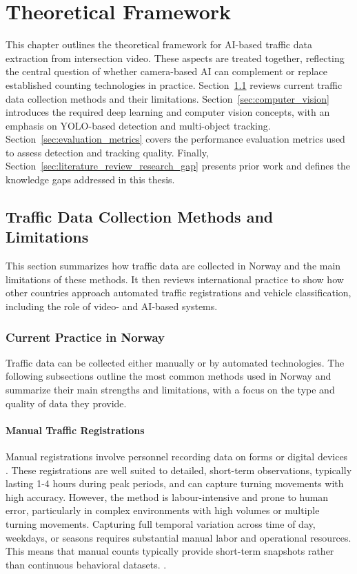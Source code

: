 \chapter{Theoretical Framework}
\label{chap:theory}
This chapter outlines the theoretical framework for AI-based traffic data extraction from intersection video. These aspects are treated together, reflecting the central question of whether camera-based AI can complement or replace established counting technologies in practice. Section~\ref{sec:traffic_data_collection_methods} reviews current traffic data collection methods and their limitations. Section~\ref{sec:computer_vision} introduces the required deep learning and computer vision concepts, with an emphasis on YOLO-based detection and multi-object tracking. Section~\ref{sec:evaluation_metrics} covers the performance evaluation metrics used to assess detection and tracking quality. Finally, Section~\ref{sec:literature_review_research_gap} presents prior work and defines the knowledge gaps addressed in this thesis.


\section{Traffic Data Collection Methods and Limitations}
\label{sec:traffic_data_collection_methods}
This section summarizes how traffic data are collected in Norway and the main limitations of these methods. It then reviews international practice to show how other countries approach automated traffic registrations and vehicle classification, including the role of video- and AI-based systems.

\subsection{Current Practice in Norway}
Traffic data can be collected either manually or by automated technologies. The following subsections outline the most common methods used in Norway and summarize their main strengths and limitations, with a focus on the type and quality of data they provide.

\subsubsection{Manual Traffic Registrations}
Manual registrations involve personnel recording data on forms or digital devices \citep{SVV_V714}. These registrations are well suited to detailed, short-term observations, typically lasting 1-4 hours during peak periods, and can capture turning movements with high accuracy. However, the method is labour-intensive and prone to human error, particularly in complex environments with high volumes or multiple turning movements. Capturing full temporal variation across time of day, weekdays, or seasons requires substantial manual labor and operational resources. This means that manual counts typically provide short-term snapshots rather than continuous behavioral datasets. \citep{SVV_V714}.

